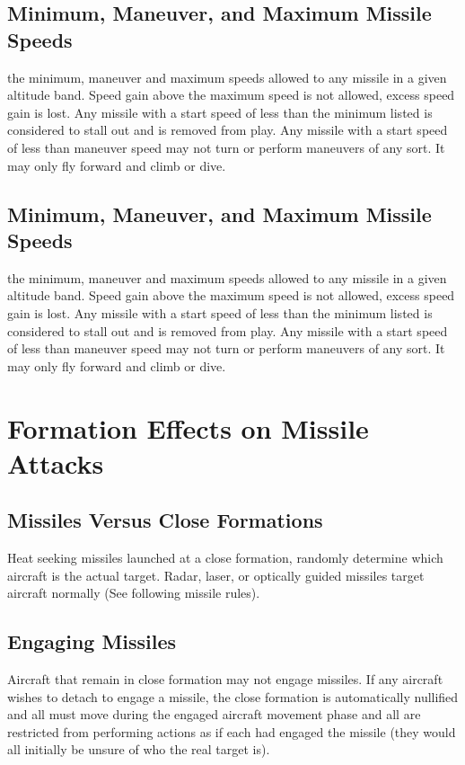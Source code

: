 \begin{advancedrules}
    \subsection{Minimum, Maneuver, and Maximum Missile Speeds}  the minimum, maneuver and maximum speeds allowed to any missile in a given altitude band. Speed gain above the maximum speed is not allowed, excess speed gain is lost. Any missile with a start speed of less than the minimum listed is considered to stall out and is removed from play. Any missile with a start speed of less than maneuver speed may not turn or perform maneuvers of any sort. It may only fly forward and climb or dive.

    \subsection{Minimum, Maneuver, and Maximum Missile Speeds}  the minimum, maneuver and maximum speeds allowed to any missile in a given altitude band. Speed gain above the maximum speed is not allowed, excess speed gain is lost. Any missile with a start speed of less than the minimum listed is considered to stall out and is removed from play. Any missile with a start speed of less than maneuver speed may not turn or perform maneuvers of any sort. It may only fly forward and climb or dive.

    \section{Formation Effects on Missile Attacks}

    \subsection{Missiles Versus Close Formations} Heat seeking missiles launched at a close formation, randomly determine which aircraft is the actual target. Radar, laser, or optically guided missiles target aircraft normally (See following missile rules).

    \subsection{Engaging Missiles} Aircraft that remain in close formation may not engage missiles. If any aircraft wishes to detach to engage a missile, the close formation is automatically nullified and all must move during the engaged aircraft movement phase and all are restricted from performing actions as if each had engaged the missile (they would all initially be unsure of who the real target is).

\end{advancedrules}
